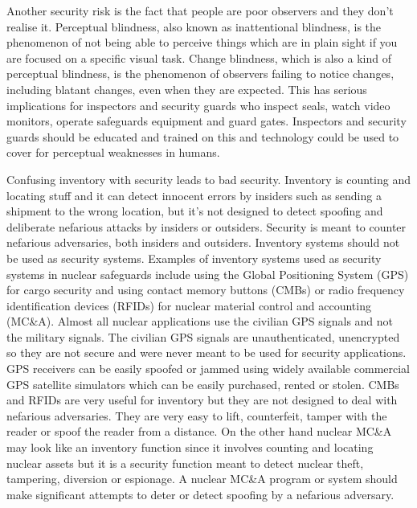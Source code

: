 \documentclass[twoside,titlepage,11pt,twocolumn,a4paper]{article}
\begin{document}
Another security risk is the fact that people are poor observers and
they don't realise it. Perceptual blindness, also known as
inattentional blindness, is the phenomenon of not being able to
perceive things which are in plain sight if you are focused on a
specific visual task. Change blindness, which is also a kind of
perceptual blindness, is the phenomenon of observers failing to notice
changes, including blatant changes, even when they are expected. This
has serious implications for inspectors and security guards who
inspect seals, watch video monitors, operate safeguards equipment and
guard gates. Inspectors and security guards should be educated and
trained on this and technology could be used to cover for perceptual
weaknesses in humans. \citep{insiderThreat2011}

Confusing inventory with security leads to bad security. Inventory is
counting and locating stuff and it can detect innocent errors by
insiders such as sending a shipment to the wrong location, but it’s
not designed to detect spoofing and deliberate nefarious attacks by
insiders or outsiders. \citep{handbookSecBlunders2010} Security is
meant to counter nefarious adversaries, both insiders and
outsiders. \citep{insiderThreat2011} Inventory systems should not be
used as security systems. Examples of inventory systems used as
security systems in nuclear safeguards include using the Global
Positioning System (GPS) for cargo security and using contact memory
buttons (CMBs) or radio frequency identification devices (RFIDs) for
nuclear material control and accounting
(MC\&A). \citep{handbookSecBlunders2010} Almost all nuclear
applications use the civilian GPS signals and not the military
signals.  The civilian GPS signals are unauthenticated, unencrypted so
they are not secure and were never meant to be used for security
applications. GPS receivers can be easily spoofed or jammed using
widely available commercial GPS satellite simulators which can be
easily purchased, rented or stolen. CMBs and RFIDs are very useful for
inventory but they are not designed to deal with nefarious
adversaries. They are very easy to lift, counterfeit, tamper with the
reader or spoof the reader from a
distance. \citep{nuclearSafeguardsAndSec2005} On the other hand
nuclear MC\&A may look like an inventory function since it involves
counting and locating nuclear assets but it is a security function
meant to detect nuclear theft, tampering, diversion or espionage.  A
nuclear MC\&A program or system should make significant attempts to
deter or detect spoofing by a nefarious
adversary. \citep{handbookSecBlunders2010}
\end{document}
